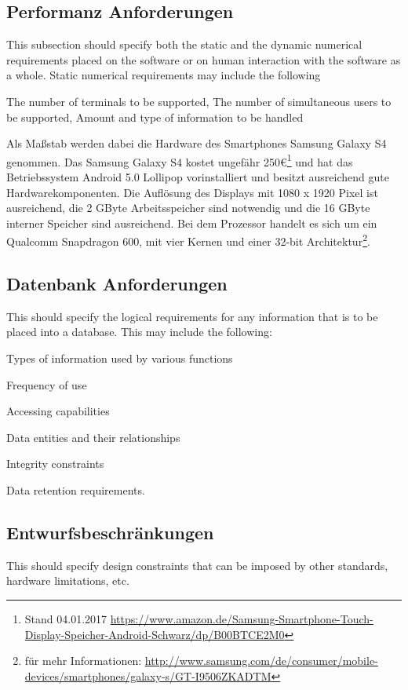 {	\subsection{Performanz Anforderungen}
		This subsection should specify both the static and the dynamic numerical requirements placed on the software or on human interaction with the software as a whole. Static numerical requirements may include the following
		
		The number of terminals to be supported, The number of simultaneous users to be supported, Amount and type of information to be handled
		
		Als Maßstab werden dabei die Hardware des Smartphones Samsung Galaxy S4 genommen. Das Samsung Galaxy S4 kostet ungefähr 250€\footnote{Stand 04.01.2017 \url{https://www.amazon.de/Samsung-Smartphone-Touch-Display-Speicher-Android-Schwarz/dp/B00BTCE2M0}} und hat das Betriebssystem Android 5.0 Lollipop vorinstalliert und besitzt ausreichend gute Hardwarekomponenten. Die Auflösung des Displays mit 1080 x 1920 Pixel ist ausreichend, die 2 GByte Arbeitsspeicher sind notwendig und die 16 GByte interner Speicher sind ausreichend. Bei dem Prozessor handelt es sich um ein Qualcomm Snapdragon 600, mit vier Kernen und einer 32-bit Architektur\footnote{für mehr Informationen: \url{http://www.samsung.com/de/consumer/mobile-devices/smartphones/galaxy-s/GT-I9506ZKADTM}}.
		
	\subsection{Datenbank Anforderungen}
		This should specify the logical requirements for any information that is to be placed into a database. This may include the following:
		
		Types of information used by various functions
		
		Frequency of use
		
		Accessing capabilities
		
		Data entities and their relationships
		
		Integrity constraints
		
		Data retention requirements.
	
	\subsection{Entwurfsbeschränkungen}
		This should specify design constraints that can be imposed by other standards, hardware limitations, etc.
		
}
